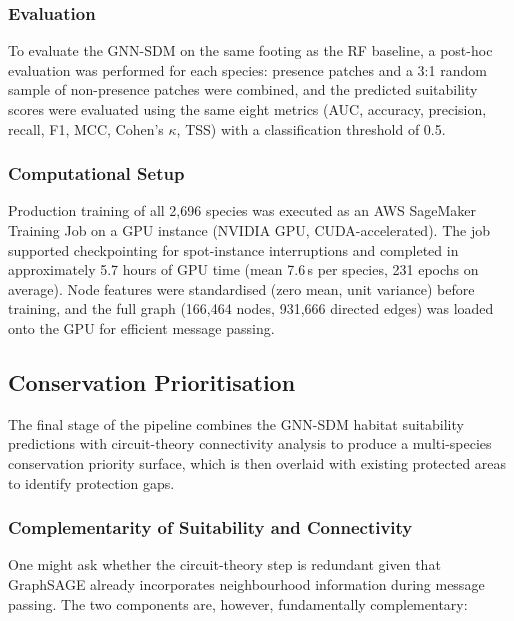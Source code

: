 \subsubsection{Evaluation}
\label{sec:evaluation}

To evaluate the GNN-SDM on the same footing as the RF baseline, a post-hoc 
evaluation was performed for each species: presence patches and a 3:1 random 
sample of non-presence patches were combined, and the predicted suitability 
scores were evaluated using the same eight metrics (AUC, accuracy, precision, 
recall, F1, MCC, Cohen's $\kappa$, TSS) with a classification threshold of 0.5.

\subsubsection{Computational Setup}
\label{sec:compute}

Production training of all 2,696 species was executed as an AWS
SageMaker Training Job on a GPU instance (NVIDIA GPU,
CUDA-accelerated). The job supported checkpointing for
spot-instance interruptions and completed in approximately 5.7
hours of GPU time (mean 7.6\,s per species, 231 epochs on
average). Node features were standardised (zero mean, unit variance) 
before training, and the full graph (166,464 nodes, 931,666 directed edges) was 
loaded onto the GPU for efficient message passing.

\subsection{Conservation Prioritisation}
\label{sec:conservation}

The final stage of the pipeline combines the GNN-SDM habitat suitability 
predictions with circuit-theory connectivity analysis to produce a multi-species 
conservation priority surface, which is then overlaid with existing protected 
areas to identify protection gaps.

\subsubsection{Complementarity of Suitability and Connectivity}
\label{sec:complementarity}

One might ask whether the circuit-theory step is redundant 
given that GraphSAGE already incorporates neighbourhood information during 
message passing. The two components are, however, fundamentally complementary:

